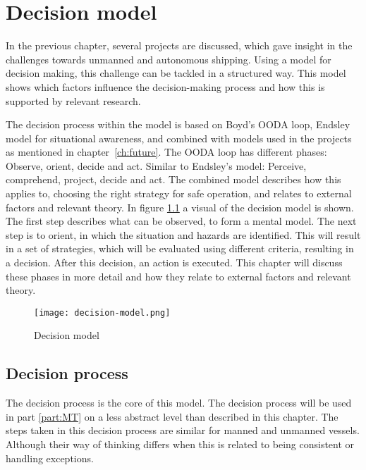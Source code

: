 \chapter{Decision model}
\label{ch:model}
In the previous chapter, several projects are discussed, which gave insight in the challenges towards unmanned and autonomous shipping. Using a model for decision making, this challenge can be tackled in a structured way. This model shows which factors influence the decision-making process and how this is supported by relevant research.

The decision process within the model is based on Boyd's OODA loop, Endsley model for situational awareness, and combined with models used in the projects as mentioned in chapter~\ref{ch:future}. 
The OODA loop has different phases: Observe, orient, decide and act. Similar to Endsley's model: Perceive, comprehend, project, decide and act. 
The combined model describes how this applies to, choosing the right strategy for safe operation, and relates to external factors and relevant theory. In figure \ref{fig:decision-model} a visual of the decision model is shown. The first step describes what can be observed, to form a mental model. The next step is to orient, in which the situation and hazards are identified. This will result in a set of strategies, which will be evaluated using different criteria, resulting in a decision. After this decision, an action is executed. This chapter will discuss these phases in more detail and how they relate to external factors and relevant theory.

\begin{figure}[hbp]
	\centering
	\texttt{[image: decision-model.png]}
	\caption{Decision model}
	\label{fig:decision-model}
\end{figure}

\section{Decision process}
The decision process is the core of this model. The decision process will be used in part \ref{part:MT} on a less abstract level than described in this chapter. The steps taken in this decision process are similar for manned and unmanned vessels. Although their way of thinking differs when this is related to being consistent or handling exceptions.

